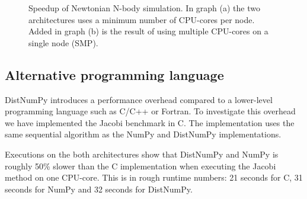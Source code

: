 \documentclass{sigplanconf}
\begin{document}
\begin{figure}%
  \begin{center}%
    \caption{Speedup of Newtonian N-body simulation. In graph (a) the two architectures uses a minimum number of CPU-cores per node. Added in graph (b) is the result of using multiple CPU-cores on a single node (SMP).}%
    \label{fig:NbodyScale}%
  \end{center}
\end{figure}

\subsection{Alternative programming language}
DistNumPy introduces a performance overhead compared to a lower-level programming language such as C/C++ or Fortran. To investigate this overhead we have implemented the Jacobi benchmark in C. The implementation uses the same sequential algorithm as the NumPy and DistNumPy implementations. 

Executions on the both architectures show that DistNumPy and NumPy is roughly 50\% slower than the C implementation when executing the Jacobi method on one CPU-core. This is in rough runtime numbers: 21 seconds for C, 31 seconds for NumPy and 32 seconds for DistNumPy.
\end{document}
